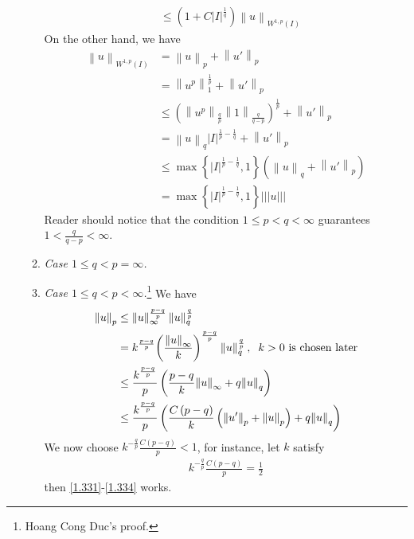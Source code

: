 \documentclass[a4paper,oneside]{article}
\numberwithin{equation}{section}
\begin{document}
\begin{enumerate}
\begin{enumerate}
\begin{align}
& \le \left( {1 + C{{\left| I \right|}^{\frac{1}{q}}}} \right){\left\| u \right\|_{{W^{1,p}}\left( I \right)}}
\end{align}
On the other hand, we have
\begin{align}
{\left\| u \right\|_{{W^{1,p}}\left( I \right)}} &= {\left\| u \right\|_p} + {\left\| {u'} \right\|_p}\\
 &= \left\| {{u^p}} \right\|_1^{\frac{1}{p}} + {\left\| {u'} \right\|_p}\\
& \le {\left( {{{\left\| {{u^p}} \right\|}_{\frac{q}{p}}}{{\left\| 1 \right\|}_{\frac{q}{{q - p}}}}} \right)^{\frac{1}{p}}} + {\left\| {u'} \right\|_p}\\
& = {\left\| u \right\|_q}{\left| I \right|^{\frac{1}{p} - \frac{1}{q}}} + {\left\| {u'} \right\|_p}\\
& \le \max \left\{ {{{\left| I \right|}^{\frac{1}{p} - \frac{1}{q}}},1} \right\}\left( {{{\left\| u \right\|}_q} + {{\left\| {u'} \right\|}_p}} \right)\\
& = \max \left\{ {{{\left| I \right|}^{\frac{1}{p} - \frac{1}{q}}},1} \right\}|||u|||
\end{align} 
Reader should notice that the condition $1\le p<q<\infty$ guarantees $1 < \frac{q}{{q - p}} < \infty $.
\item \textit{Case $1 \le q < p = \infty $.} 
\item \textit{Case $1\le q<p<\infty$.}\footnote{Hoang Cong Duc's proof.} We have
\begin{align}
\label{1.331}
{\left\| u \right\|_p} &\le \left\| u \right\|_\infty ^{\frac{{p - q}}{p}}\left\| u \right\|_q^{\frac{q}{p}}\\
& = {k^{\frac{{p - q}}{p}}}{\left( {\frac{{{{\left\| u \right\|}_\infty }}}{k}} \right)^{\frac{{p - q}}{p}}}\left\| u \right\|_q^{\frac{q}{p}},\hspace{0.2cm} k > 0\mbox{ is chosen later}\\
& \le \frac{{{k^{\frac{{p - q}}{p}}}}}{p}\left( {\frac{{p - q}}{k}{{\left\| u \right\|}_\infty } + q{{\left\| u \right\|}_q}} \right)\\
 &\le \frac{{{k^{\frac{{p - q}}{p}}}}}{p}\left( {\frac{{C\left( {p - q} \right)}}{k}\left( {{{\left\| {u'} \right\|}_p} + {{\left\| u \right\|}_p}} \right) + q{{\left\| u \right\|}_q}} \right)\label{1.334}
\end{align}
We now choose ${k^{ - \frac{q}{p}}}\frac{{C\left( {p - q} \right)}}{p} < 1$, for instance, let $k$ satisfy
\begin{align}
{k^{ - \frac{q}{p}}}\frac{{C\left( {p - q} \right)}}{p} = \frac{1}{2}
\end{align}
then \eqref{1.331}-\eqref{1.334} works.
\end{enumerate}
\end{enumerate}
\end{document}
